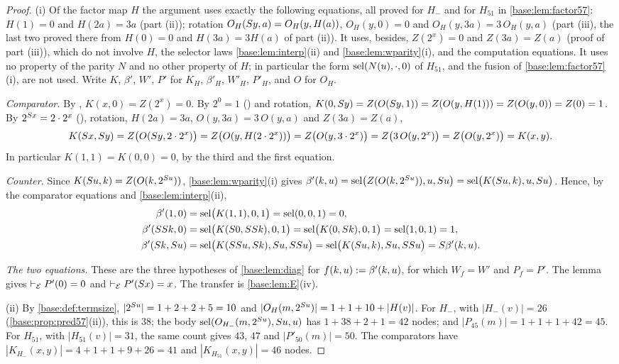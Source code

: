 \begin{proof}
(i) Of the factor map $H$ the argument uses exactly the following
equations, all proved for $H_-$ and for $H_{51}$ in \cref{base:lem:factor57}:
$H(1)=0$ and $H(2a)=3a$ (part (ii)); rotation $O_H(S y,a)=O_H(y,H(a))$,
$O_H(y,0)=0$ and $O_H(y,3a)=3\,O_H(y,a)$ (part (iii), the last two proved
there from $H(0)=0$ and $H(3a)=3H(a)$ of part (ii)).  It uses, besides,
$Z(2^{x})=0$ and $Z(3a)=Z(a)$ (proof of part (iii)), which do not involve
$H$, the selector laws \cref{base:lem:interp}(ii) and
\cref{base:lem:wparity}(i), and the computation equations.  It uses no
property of the parity $N$ and no other property of $H$; in particular the
form $\operatorname{sel}(N(u),\cdot,0)$ of $H_{51}$, and the fusion of
\cref{base:lem:factor57}(i), are not used.  Write $K$, $\beta'$, $W'$, $P'$
for $K_H$, $\beta'_H$, $W'_H$, $P'_H$, and $O$ for $O_H$.

\emph{Comparator.}  By , $K(x,0)=Z(2^{x})=0$.  By $2^{0}=1$
() and rotation, $K(0,S y)=Z(O(S y,1))=Z(O(y,H(1)))=Z(O(y,0))=Z(0)=1$.  By
$2^{S x}=2\cdot 2^{x}$ (), rotation, $H(2a)=3a$,
$O(y,3a)=3\,O(y,a)$ and $Z(3a)=Z(a)$,
\[
 K(S x,S y)=Z\bigl(O(S y,2\cdot 2^{x})\bigr)
 =Z\bigl(O(y,H(2\cdot 2^{x}))\bigr)=Z\bigl(O(y,3\cdot 2^{x})\bigr)
 =Z\bigl(3\,O(y,2^{x})\bigr)=Z\bigl(O(y,2^{x})\bigr)=K(x,y).
\]
In particular $K(1,1)=K(0,0)=0$, by the third and the first equation.

\emph{Counter.}  Since $K(S u,k)=Z(O(k,2^{S u}))$,
\cref{base:lem:wparity}(i) gives
$\beta'(k,u)=\operatorname{sel}\bigl(Z(O(k,2^{S u})),u,S u\bigr)=\operatorname{sel}\bigl(K(S u,k),u,S u\bigr)$.
Hence, by the comparator equations and \cref{base:lem:interp}(ii),
\begin{align*}
 \beta'(1,0)&=\operatorname{sel}\bigl(K(1,1),0,1\bigr)=\operatorname{sel}(0,0,1)=0,\\
 \beta'(SS k,0)&=\operatorname{sel}\bigl(K(S 0,SS k),0,1\bigr)
  =\operatorname{sel}\bigl(K(0,S k),0,1\bigr)=\operatorname{sel}(1,0,1)=1,\\
 \beta'(S k,S u)&=\operatorname{sel}\bigl(K(SS u,S k),S u,SS u\bigr)
  =\operatorname{sel}\bigl(K(S u,k),S u,SS u\bigr)=S\beta'(k,u).
\end{align*}

\emph{The two equations.}  These are the three hypotheses of
\cref{base:lem:diag} for $f(k,u)\mathrel{:=}\beta'(k,u)$, for which
$W_f=W'$ and $P_f=P'$.  The lemma gives $\vdash_{\mathcal E}P'(0)=0$ and
$\vdash_{\mathcal E}P'(S x)=x$.  The transfer is \cref{base:lem:E}(iv).

(ii) By \cref{base:def:termsize}, $|2^{S u}|=1+2+2+5=10$ and
$|O_H(m,2^{S u})|=1+1+10+|H(v)|$.  For $H_-$, with $|H_-(v)|=26$
(\cref{base:prop:pred57}(ii)), this is $38$; the body
$\operatorname{sel}(O_{H_-}(m,2^{S u}),S u,u)$ has $1+38+2+1=42$ nodes; and
$|P_{45}(m)|=1+1+1+42=45$.  For $H_{51}$, with $|H_{51}(v)|=31$, the same
count gives $43$, $47$ and $|P'_{50}(m)|=50$.  The comparators have
$|K_{H_-}(x,y)|=4+1+1+9+26=41$ and $|K_{H_{51}}(x,y)|=46$ nodes.
\end{proof}

